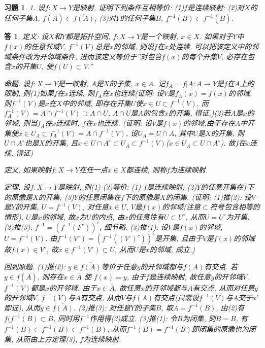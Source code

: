 \documentclass{ctexart}%
\newtheorem*{exercise}{习题}
\newtheorem*{solution}{答}
\theoremstyle{definition}
\theoremstyle{remark}
\begin{document}
\begin{exercise}1. 设$f:X\rightarrow Y$是映射, 证明下列条件互相等价: (1)$f$是连续映射; (2)对$X$的任何子集$A$, $f(\overline{A})\subset\overline{f(A)}$; (3)对$Y$的任何子集$B$, $\overline{f^{-1}(B)}\subset f^{-1}(\overline{B})$. 
\end{exercise}
\begin{solution}
定义: 设$X$和$Y$都是拓扑空间, $f:X\rightarrow Y$是一个映射, $x\in X$. 如果对于$Y$中$f(x)$的任意邻域$V$, $f^{-1}(V)$总是$x$的邻域, 则说$f$在$x$处连续. 可以把该定义中的邻域条件改为开邻域条件, 进而该定义等价于''对包含$f(x)$的每个开集$V$, 必存在包含$x$的开集$U$, 使$f(U)\subset V$.''

命题: 设$f: X\rightarrow Y$是一映射, $A$是$X$的子集, $x\in A$. 记$f_A=f|A:A\rightarrow Y$是$f$在$A$上的限制, 则(1)如果$f$在$x$连续, 则$f_A$在$x$也连续(证明: 设$V$是$f_A(x)=f(x)$的邻域, 则$f^{-1}(V)$是$x$在$X$中的邻域, 即存在开集$U$使$x\in U\subset f^{-1}(V)$, 而$f^{-1}_A(V)=A\cap f^{-1}(V)\supset A\cap U$, $A\cap U$是$A$的包含$x$的开集, 得证.)(2)若$A$是$x$的邻域, 则当$f_A$在$x$连续时, $f$在$x$也连续. (证明: 设$V$是$f(x)$的邻域,由于存在$A$中开集使$x\in U_A\subset f^{-1}_A(V)=A\cap f^{-1}(V)$, 设$U_A=U\cap A$, 其中$U$是$X$的开集, 则$U\cap A^\circ$也是$X$的开集, 且$x\in U\cap A^\circ \subset U_A\subset f^{-1}(V)$($x\in U_A\subset U\cap A^\circ$). 故$f$在$x$连续. 得证)

定义: 如果映射$f: X\rightarrow Y$在任一点$x\in X$都连续, 则称$f$为连续映射.

定理: 设$f: X\rightarrow Y$是映射, 则(1)-(3)等价: (1) $f$是连续映射; (2)$Y$的任意开集在$f$下的原像是$X$的开集; (3)$Y$的任意闭集在$f$下的原像是$X$的闭集. (证明: (1)推(2): 设$V$是$Y$的开集, $U=f^{-1}(V)$, 对任意$x\in U$, $V$是$f(x)$的邻域(注意$\subset$符号包含相等的情形), $U$是$x$的邻域, 故$x$为$U$的内点, 由$x$的任意性有$U\subset U^\circ$, 从而$U=U^\circ$为开集. (2)推(3): $f^{-1}=(f^{-1}(F^c))^c$, 细节略. (3)推(1): 设$V$是$f(x)$的邻域, $U=f^{-1}(V)$. 由$f^{-1}(V^\circ)=(f^{-1}((V^\circ)^c))^c$是开集, 且由于$V$是$f(x)$的邻域故$f(x)\in V^\circ$, 故$x\in f^{-1}(V^\circ)\subset U$, 从而$U$是$x$的邻域, 成立.)

回到原题. (1)推(2): $y\in \overline{f(A)}$等价于任意$y$的开邻域都与$f(A)$有交点. 若$y\in f(\overline{A})$, 则存在$x\in\overline{A}$ 使 $f(x)=y$, 由于$f$是连续映射, 故任意$y$的开邻域$V$, $f^{-1}(V)$都是$x$的开邻域. 由于$x\in \overline{A}$, 故任意$x$的开邻域都与$A$有交点, 从而对任意$y$的开邻域$V$, $f^{-1}(V)$与$A$有交点, 从而$V$与$f(A)$有交点(只需设$f^{-1}(V)$与$A$交于$x'$即证), 从而$y\in \overline{f(A)}$. (2)推(3): 对任意$Y$的子集$B$, 取$A=f^{-1}(B)$, 由(2)有$f(\overline{f^{-1}(B)}\subset\overline{B}$, 同时用$f^{-1}$作用得(3)成立. (3)推(1): 令$B$为闭集, 则$\overline{B}=B$, 有$\overline{f^{-1}(B)}\subset f^{-1}(B)\subset  \overline{f^{-1}(B)}$, 从而$\overline{f^{-1}(B)}= f^{-1}(B)$即闭集的原像也为闭集, 从而由上方定理(3), $f$为连续映射. 
\end{solution}
\end{document}
